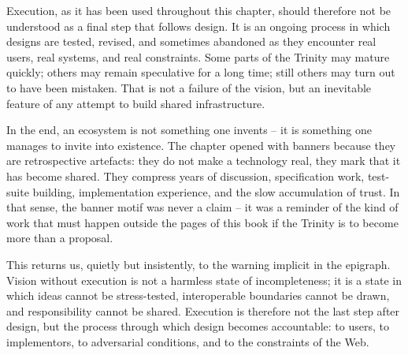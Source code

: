 Execution, as it has been used throughout this chapter, should therefore not be understood as a final step that follows design. It is an ongoing process in which designs are tested, revised, and sometimes abandoned as they encounter real users, real systems, and real constraints. Some parts of the Trinity may mature quickly; others may remain speculative for a long time; still others may turn out to have been mistaken. That is not a failure of the vision, but an inevitable feature of any attempt to build shared infrastructure.



In the end, an ecosystem is not something one invents -- it is something one manages to invite into existence. The chapter opened with banners because they are retrospective artefacts: they do not make a technology real, they mark that it has become shared. They compress years of discussion, specification work, test-suite building, implementation experience, and the slow accumulation of trust. In that sense, the banner motif was never a claim -- it was a reminder of the kind of work that must happen outside the pages of this book if the Trinity is to become more than a proposal.

This returns us, quietly but insistently, to the warning implicit in the epigraph. Vision without execution is not a harmless state of incompleteness; it is a state in which ideas cannot be stress-tested, interoperable boundaries cannot be drawn, and responsibility cannot be shared. Execution is therefore not the last step after design, but the process through which design becomes accountable: to users, to implementors, to adversarial conditions, and to the constraints of the Web.


